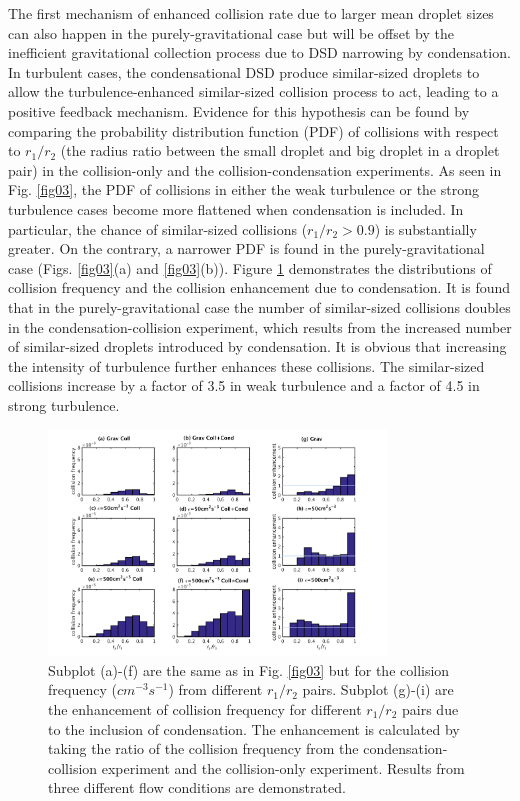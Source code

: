 The first mechanism of enhanced collision rate due to larger mean droplet sizes can also happen in the purely-gravitational case but will be offset by the inefficient gravitational collection process due to DSD narrowing by condensation. In turbulent cases, the condensational DSD produce similar-sized droplets to allow the turbulence-enhanced similar-sized collision process to act, leading to a positive feedback mechanism. Evidence for this hypothesis can be found by comparing the probability distribution function (PDF) of collisions with respect to $r_1/r_2$ (the radius ratio between the small droplet and big droplet in a droplet pair) in the collision-only and the collision-condensation experiments. As seen in Fig. \ref{fig03}, the PDF of collisions in either the weak turbulence or the strong turbulence cases become more flattened when condensation is included. In particular, the chance of similar-sized collisions ($r_1/r_2>0.9$) is substantially greater. On the contrary, a narrower PDF is found in the purely-gravitational case (Figs. \ref{fig03}(a) and \ref{fig03}(b)). Figure \ref{fig04} demonstrates the distributions of collision frequency and the collision enhancement due to condensation. It is found that in the purely-gravitational case the number of similar-sized collisions doubles in the condensation-collision experiment, which results from the increased number of similar-sized droplets introduced by condensation. It is obvious that increasing the intensity of turbulence further enhances these collisions. The similar-sized collisions increase by a factor of 3.5 in weak turbulence and a factor of 4.5 in strong turbulence. 

\begin{figure}[ht]
\centering
\includegraphics[width=0.8\textwidth]{Figures/Chap4/Freq_and_enhance.png}
\caption{Subplot (a)-(f) are the same as in Fig. \ref{fig03} but for the collision frequency ($cm^{-3} s^{-1}$) from different $r_1/r_2$ pairs.  Subplot (g)-(i) are the enhancement of collision frequency for different $r_1/r_2$ pairs due to the inclusion of condensation. The enhancement is calculated by taking the ratio of the collision frequency from the condensation-collision experiment and the collision-only experiment. Results from three different flow conditions are demonstrated.}\label{fig04}
\end{figure}

